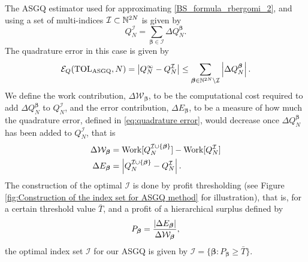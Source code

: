 The ASGQ estimator used for approximating \eqref{BS_formula_rbergomi_2}, and using a set of multi-indices $\mathcal{I}\subset \mathbb{N}^{2N}$ is given by
\begin{equation}\label{eq:MISC_quad_estimator}
	Q_N^{\mathcal{I}} = \sum_{\boldsymbol{\beta} \in \mathcal{I}} \Delta Q_N^{\boldsymbol{\beta}}.
\end{equation}
The quadrature error in this  case  is given by
\begin{equation}\label{eq:quadrature error}
	\mathcal{E}_Q(\text{TOL}_{\text{ASGQ}},N) =\left\lvert Q_N^\infty - Q_N^\mathcal{I}\right\rvert \le \sum_{\boldsymbol{\beta} \in \mathbb{N}^{2N} \setminus
		\mathcal{I}} \left\lvert\Delta Q_N^{\boldsymbol{\beta}}\right\rvert.
\end{equation}
We define the work contribution, $\Delta \mathcal{W}_{\boldsymbol{\beta}}$, to be the computational cost  required to add  $\Delta Q_N^{\boldsymbol{\beta}}$ to $Q^{\mathcal{I}}_N$, and the error contribution, $\Delta E_{\boldsymbol{\beta}}$, to be  a measure of how much the quadrature error, defined in \eqref{eq:quadrature error}, would decrease once $\Delta Q_N^{\boldsymbol{\beta}}$  has been added to  $Q^{\mathcal{I}}_N$, that is 
\begin{align}\label{eq:Work_error_contributions}
\Delta \mathcal{W}_{\boldsymbol{\beta}} &= \text{Work}[Q^{\mathcal{I} \cup \{\boldsymbol{\beta}\}}_N]-\text{Work}[Q^{\mathcal{I}}_N]\\
\Delta E_{\boldsymbol{\beta}} &= \left\lvert Q^{\mathcal{I} \cup \{\boldsymbol{\beta}\}}_N-Q^{\mathcal{I}}_N\right\rvert.
\end{align}
 The  construction of the optimal  $\mathcal{I}$ is done by profit thresholding (see Figure \ref{fig:Construction of the index set for ASGQ method} for illustration), that is, for a certain threshold value $\bar{T}$, and a profit of a hierarchical surplus defined by
 \begin{equation*}
 P_{\boldsymbol{\beta}}= \frac{\left\lvert\Delta E_{\boldsymbol{\beta}}\right\rvert}{\Delta\mathcal{W}_{\boldsymbol{\beta}}},
 \end{equation*}
the optimal index set  $\mathcal{I}$  for our ASGQ is given by 
 $\mathcal{I}=\{\boldsymbol{\beta}: P_{\boldsymbol{\beta}}	 \ge \bar{T}\}$. 
 \FloatBarrier
